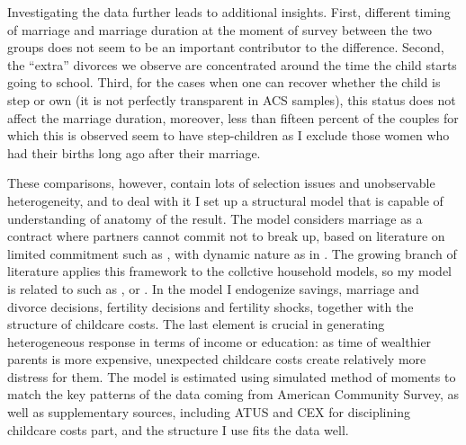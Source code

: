 \documentclass[12pt,letter]{article}
\begin{document}
Investigating the data further leads to additional insights. First, different timing of marriage and marriage duration at the moment of survey between the two groups does not seem to be an important contributor to the difference. Second, the ``extra'' divorces we observe are concentrated around the time the child starts going to school. Third, for the cases when one can recover whether the child is step or own (it is not perfectly transparent in ACS samples), this status does not affect the marriage duration, moreover, less than fifteen percent of the couples for which this is observed seem to have step-children as I exclude those women who had their births long ago after their marriage. %

These comparisons, however, contain lots of selection issues and unobservable heterogeneity, and to deal with it I set up a structural model that is capable of understanding of anatomy of the result. The model considers marriage as a contract where partners cannot commit not to break up, based on literature on limited commitment such as \cite{kocherlakota}, with dynamic nature as in \cite{marcetmarimon}. The growing branch of literature applies this framework to the collctive household models, so my model is related to such as \cite{voena-1}, \cite{mazzocco} or \cite{shephard}. In the model I endogenize savings, marriage and divorce decisions, fertility decisions and fertility shocks, together with the structure of childcare costs. The last element is crucial in generating heterogeneous response in terms of income or education: as time of wealthier parents is more expensive, unexpected childcare costs create relatively more distress for them. The model is estimated using simulated method of moments to match the key patterns of the data coming from American Community Survey, as well as supplementary sources, including ATUS and CEX for disciplining childcare costs part, and the structure I use fits the data well.
\end{document}
